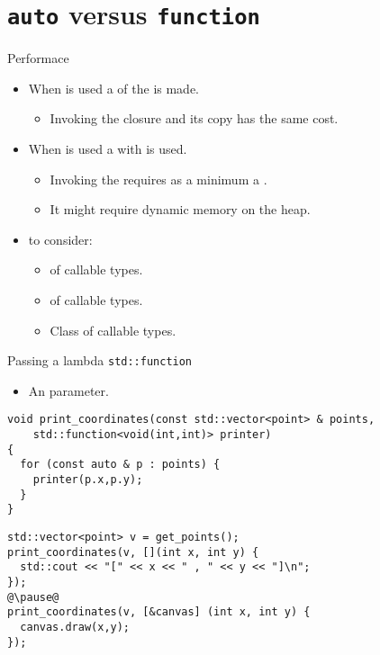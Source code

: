 \section{\texttt{auto} versus \texttt{function}}

\begin{frame}[t]{Performace}
  \begin{itemize}
    \item When  is used a  of the  is made.
      \begin{itemize}
        \item Invoking the closure and its copy has the same cost.
      \end{itemize}

    \item When  is used a 
          with  is used.
      \begin{itemize}
        \item Invoking the  requires as a minimum a 
              .
        \item It might require dynamic memory on the heap.
      \end{itemize}

    \item {} to consider:
      \begin{itemize}
        \item {} of callable types.
        \item {} of callable types.
        \item Class  of callable types.
      \end{itemize}
  \end{itemize}
\end{frame}

\begin{frame}[t,fragile]{Passing a lambda \texttt{std::function}}
\begin{itemize}
  \item An  parameter.
\end{itemize}
\begin{lstlisting}
void print_coordinates(const std::vector<point> & points,
    std::function<void(int,int)> printer)
{
  for (const auto & p : points) {
    printer(p.x,p.y);
  }
}
\end{lstlisting}

\begin{lstlisting}[escapechar=@]
std::vector<point> v = get_points();
print_coordinates(v, [](int x, int y) {
  std::cout << "[" << x << " , " << y << "]\n";
});
@\pause@
print_coordinates(v, [&canvas] (int x, int y) {
  canvas.draw(x,y);
});
\end{lstlisting}
\end{frame}

